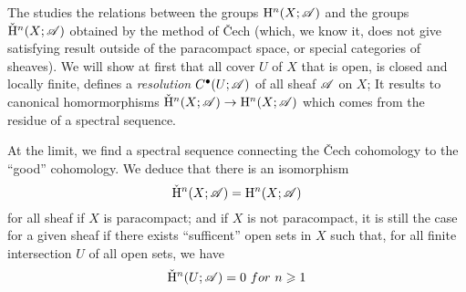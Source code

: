 The  studies the relations between the groups $\mathrm{H}^n(X;\mathscr{A})$ and the groups $\check{\mathrm{H}}^n(X;\mathscr{A})$ obtained by the method of \v{C}ech 
(which, we know it, does not give satisfying result outside of the paracompact space, or special categories of sheaves). 
We will show at first that all cover $U$ of $X$ that is open, is closed and locally finite, defines a \emph{resolution} ${C}^{\bullet}(U;\mathscr{A})$ of all sheaf $\mathscr{A}$ on $X$; 
It results to canonical homormorphisms $\check{\mathrm{H}}^n(X;\mathscr{A}) \rightarrow \mathrm{H}^n(X;\mathscr{A})$ which comes from the residue of a spectral sequence. 

At the limit, we find a spectral sequence connecting the \v{C}ech cohomology to the ``good'' cohomology. 
We deduce that there is an isomorphism
\[
    \check{\mathrm{H}}^n(X;\mathscr{A}) = \mathrm{H}^n(X;\mathscr{A})
\]
for all sheaf if $X$ is paracompact; 
and if $X$ is not paracompact, it is still the case for a given sheaf if there exists ``sufficent'' open sets in $X$ such that, for all finite intersection $U$ of all open sets, we have
\[
    \check{\mathrm{H}}^n(U;\mathscr{A}) = 0 \ for\ n\geqslant 1
\]
